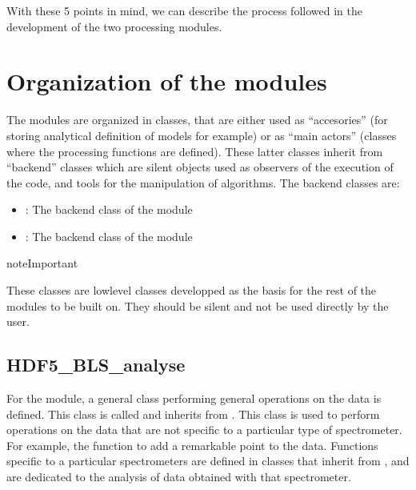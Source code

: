 \documentclass[letterpaper,10pt,english]{sphinxmanual}
\begin{document}
\sphinxAtStartPar
With these 5 points in mind, we can describe the process followed in the development of the two processing modules.


\section{Organization of the modules}
\label{\detokenize{source/data_processing:organization-of-the-modules}}
\sphinxAtStartPar
The modules are organized in classes, that are either used as “accesories” (for storing analytical definition of models for example) or as “main actors” (classes where the processing functions are defined). These latter classes inherit from “backend” classes which are silent objects used as observers of the execution of the code, and tools for the manipulation of algorithms. The backend classes are:
\begin{itemize}
\item {} 
\sphinxAtStartPar
{}: The backend class of the  module

\item {} 
\sphinxAtStartPar
{}: The backend class of the  module

\end{itemize}

\begin{sphinxadmonition}{note}{Important}

\sphinxAtStartPar
These classes are low\sphinxhyphen{}level classes developped as the basis for the rest of the modules to be built on. They should be silent and not be used directly by the user.
\end{sphinxadmonition}


\subsection{HDF5\_BLS\_analyse}
\label{\detokenize{source/data_processing:hdf5-bls-analyse}}
\sphinxAtStartPar
For the  module, a general class performing general operations on the data is defined. This class is called  and inherits from . This class is used to perform operations on the data that are not specific to a particular type of spectrometer. For example, the function to add a remarkable point to the data.
Functions specific to a particular spectrometers are defined in classes that inherit from , and are dedicated to the analysis of data obtained with that spectrometer.
\end{document}
